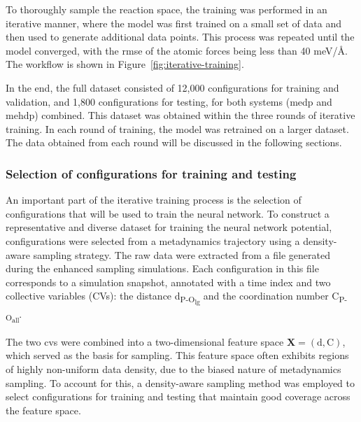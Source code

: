 To thoroughly sample the reaction space, the training was performed in an iterative manner, where the model was first trained on a small set of data and then used to generate additional data points. This process was repeated until the model converged, with the \ac{rmse} of the atomic forces being less than 40 meV/\AA. The workflow is shown in Figure~\ref{fig:iterative-training}.

In the end, the full dataset consisted of 12,000 configurations for training and validation, and 1,800 configurations for testing, for both systems (\ac{medp} and \ac{mehdp}) combined. This dataset was obtained within the three rounds of iterative training. In each round of training, the model was retrained on a larger dataset. The data obtained from each round will be discussed in the following sections.



\subsubsection{Selection of configurations for training and testing}

An important part of the iterative training process is the selection of configurations that will be used to train the neural network. To construct a representative and diverse dataset for training the neural network potential, configurations were selected from a metadynamics trajectory using a density-aware sampling strategy. The raw data were extracted from a file generated during the enhanced sampling simulations. Each configuration in this file corresponds to a simulation snapshot, annotated with a time index and two collective variables (CVs): the distance d\textsubscript{P-O\textsubscript{lg}} and the coordination number C\textsubscript{P-O\textsubscript{all}}.

The two \acp{cv} were combined into a two-dimensional feature space $\mathbf{X} = (\mathrm{d}, \mathrm{C})$, which served as the basis for sampling. This feature space often exhibits regions of highly non-uniform data density, due to the biased nature of metadynamics sampling. To account for this, a density-aware sampling method was employed to select configurations for training and testing that maintain good coverage across the feature space.

